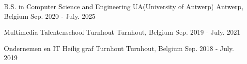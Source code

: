 

\begin{cventries}

  \cventry
    {B.S. in Computer Science and Engineering} %
    {UA(University of Antwerp)} %
    {Antwerp, Belgium} %
    {Sep. 2020 ‑ July. 2025} %
    {
    }
    
  \cventry
    {Multimedia} %
    {Talentenschool Turnhout} %
    {Turnhout, Belgium} %
    {Sep. 2019 ‑ July. 2021} %
    {
}

  \cventry
    {Ondernemen en IT} %
    {Heilig graf Turnhout} %
    {Turnhout, Belgium} %
    {Sep. 2018 ‑ July. 2019} %
    {
    }

\end{cventries}

